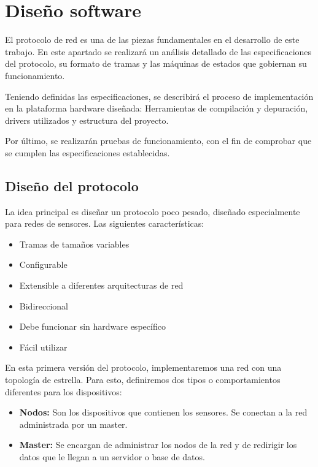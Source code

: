\chapter{Diseño software}
\label{chap:soft}
\graphicspath{{soft/figs/}{soft/figs/}}


El protocolo de red es una de las piezas fundamentales en el desarrollo de este trabajo. En este apartado se realizará un análisis detallado de las especificaciones del protocolo, su formato de tramas y las máquinas de estados que gobiernan su funcionamiento.

Teniendo definidas las especificaciones, se describirá el proceso de implementación en la plataforma hardware diseñada: Herramientas de compilación y depuración, drivers utilizados y estructura del proyecto. 

Por último, se realizarán pruebas de funcionamiento, con el fin de comprobar que se cumplen las especificaciones establecidas.


\section{Diseño del protocolo}

La idea principal es diseñar un protocolo poco pesado, diseñado especialmente para redes de sensores. Las siguientes características:

\begin{itemize}
	\item Tramas de tamaños variables
	\item Configurable
	\item Extensible a diferentes arquitecturas de red
	\item Bidireccional 
	\item Debe funcionar sin hardware específico
	\item Fácil utilizar
\end{itemize}

En esta primera versión del protocolo, implementaremos una red con una topología de estrella. Para esto, definiremos dos tipos o comportamientos diferentes para los dispositivos:

\begin{itemize}
	\item \textbf{Nodos:} Son los dispositivos que contienen los sensores. Se conectan a la red administrada por un master. 
	\item \textbf{Master:} Se encargan de administrar los nodos de la red y de redirigir los datos que le llegan a un servidor o base de datos.
\end{itemize}

